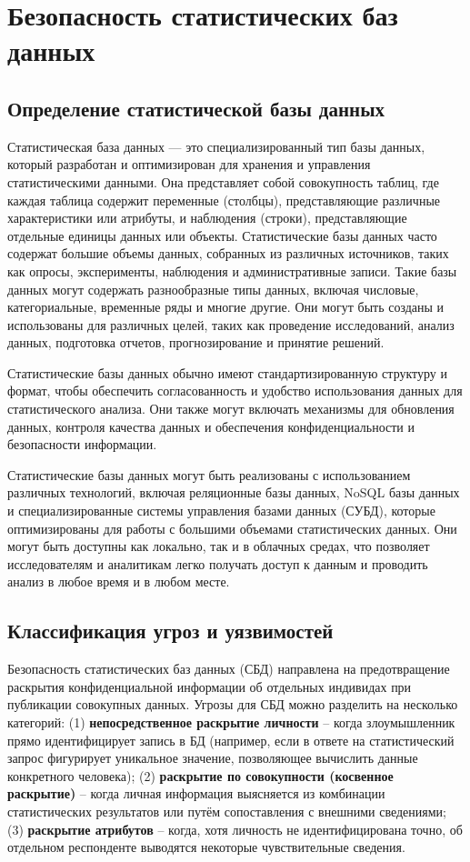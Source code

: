 \section{Безопасность статистических баз данных}
\subsection{Определение статистической базы данных}
Статистическая база данных — это специализированный тип базы данных, который разработан и оптимизирован для хранения и
управления статистическими данными. Она представляет собой совокупность таблиц, где каждая таблица содержит переменные
(столбцы), представляющие различные характеристики или атрибуты, и наблюдения (строки), представляющие отдельные единицы
данных или объекты. Статистические базы данных часто содержат большие объемы данных, собранных из различных источников,
таких как опросы, эксперименты, наблюдения и административные записи. Такие базы данных могут содержать разнообразные
типы данных, включая числовые, категориальные, временные ряды и многие другие. Они могут быть созданы и использованы для
различных целей, таких как проведение исследований, анализ данных, подготовка отчетов, прогнозирование и принятие
решений.


Статистические базы данных обычно имеют стандартизированную структуру и формат, чтобы обеспечить согласованность и
удобство использования данных для статистического анализа. Они также могут включать механизмы для обновления данных,
контроля качества данных и обеспечения конфиденциальности и безопасности информации.

Статистические базы данных могут быть реализованы с использованием различных технологий, включая реляционные базы
данных, NoSQL базы данных и специализированные системы управления базами данных (СУБД), которые оптимизированы для
работы с большими объемами статистических данных. Они могут быть доступны как локально, так и в облачных средах, что
позволяет исследователям и аналитикам легко получать доступ к данным и проводить анализ в любое время и в любом месте.

\subsection{Классификация угроз и уязвимостей}
Безопасность статистических баз данных (СБД) направлена на предотвращение раскрытия
конфиденциальной информации об отдельных индивидах при публикации совокупных данных.
Угрозы для СБД можно разделить на несколько категорий: (1) \textbf{непосредственное
раскрытие личности} – когда злоумышленник прямо идентифицирует запись в БД (например, если
в ответе на статистический запрос фигурирует уникальное значение, позволяющее вычислить
данные конкретного человека); (2) \textbf{раскрытие по совокупности (косвенное раскрытие)}
– когда личная информация выясняется из комбинации статистических результатов или путём
сопоставления с внешними сведениями; (3) \textbf{раскрытие атрибутов} – когда, хотя
личность не идентифицирована точно, об отдельном респонденте выводятся некоторые
чувствительные сведения.

